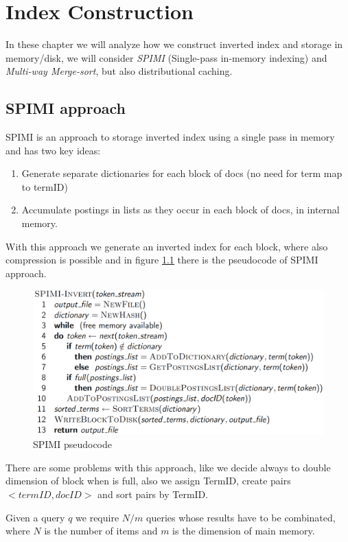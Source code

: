 \chapter{Index Construction}
In these chapter we will analyze how we construct inverted index and storage in memory/disk, we will consider 
\emph{SPIMI} (Single-pass in-memory indexing) and \emph{Multi-way Merge-sort}, but also distributional caching.

\section{SPIMI approach}
SPIMI is an approach to storage inverted index using a single pass in memory and has two key ideas:
\begin{enumerate}
	\item Generate separate dictionaries for each block of docs (no need for term map to termID)
	\item Accumulate postings in lists as they occur in each block of docs, in internal memory.
\end{enumerate}
With this approach we generate an inverted index for each block, where also compression is possible and 
in figure \ref{img:spimi} there is the pseudocode of SPIMI approach.

\begin{figure}
	\caption{SPIMI pseudocode}
	\label{img:spimi}
	\includegraphics[width=\textwidth]{Images/spimi}
\end{figure}
There are some problems with this approach, like we decide always to double dimension of block when is full, also 
we assign TermID, create pairs $<termID, docID>$ and sort pairs by TermID.

Given a query $q$ we require $N / m$ queries whose results have to be combinated, where $N$ is the number of items 
and $m$ is the dimension of main memory.


